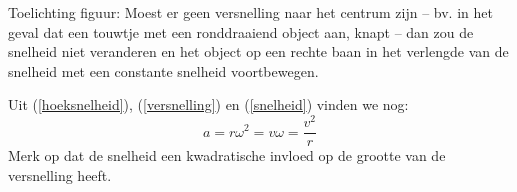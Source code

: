 \documentclass{ximera}
\begin{document}


Toelichting figuur: Moest er geen versnelling naar het centrum zijn -- bv. in het geval dat een touwtje met een ronddraaiend object aan, knapt -- dan zou de snelheid niet veranderen en het object op een rechte baan in het verlengde van de snelheid met een constante snelheid voortbewegen.

Uit (\ref{hoeksnelheid}), (\ref{versnelling}) en (\ref{snelheid}) vinden we nog:
\begin{equation}
	a=r\omega^2=v\omega=\frac{v^2}{r}
\end{equation}
Merk op dat de snelheid een kwadratische invloed op de grootte van de versnelling heeft.
\end{document}
